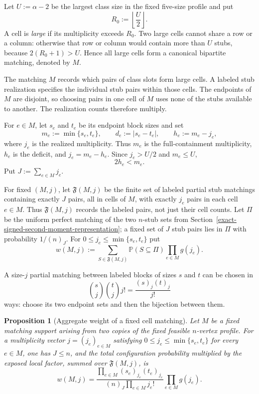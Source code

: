 \documentclass[a4paper,10pt,reqno]{amsart}
\numberwithin{equation}{section}
\theoremstyle{plain}
\newtheorem{proposition}[theorem]{Proposition}
\theoremstyle{remark}
\begin{document}
Let $U:=\alpha-2$ be the largest class size in the fixed five-size profile and put
\[
  R_0:=\left\lfloor\frac U2\right\rfloor.
\]
A cell is \emph{large} if its multiplicity exceeds $R_0$. Two large cells cannot
share a row or a column: otherwise that row or column would contain more than
$U$ stubs, because $2(R_0+1)>U$. Hence all large cells form a canonical
bipartite matching, denoted by $M$.

The matching $M$ records which pairs of class slots form large cells.
A labeled stub realization specifies the individual stub pairs within
those cells. The endpoints of $M$ are disjoint, so choosing pairs in one
cell of $M$ uses none of the stubs available to another. The realization
counts therefore multiply.

For $e\in M$, let $s_e$ and $t_e$ be its endpoint block sizes and set
\[
  m_e:=\min\{s_e,t_e\},
  \qquad
  d_e:=|s_e-t_e|,
  \qquad
  h_e:=m_e-j_e,
\]
where $j_e$ is the realized multiplicity. Thus $m_e$ is the full-containment
multiplicity, $h_e$ is the deficit, and $j_e=m_e-h_e$. Since $j_e>U/2$ and
$m_e\le U$,
\begin{equation}
  2h_e<m_e.
  \label{eq:half-deficit}
\end{equation}
Put $J:=\sum_{e\in M}j_e$.

For fixed $(M,j)$, let $\mathfrak F(M,j)$ be the finite set of labeled partial
stub matchings containing exactly $J$ pairs, all in cells of $M$, with exactly
$j_e$ pairs in each cell $e\in M$.  Thus
\(\mathfrak F(M,j)\) records the labeled pairs, not just their cell counts.
Let $\Pi$ be the uniform perfect matching of the two $n$-stub sets from
Section~\ref{exact-signed-second-moment-representation}; a fixed set of $J$
stub pairs lies in $\Pi$ with probability $1/(n)_J$. For
$0\le j_e\le\min\{s_e,t_e\}$ put
\[
  w(M,j):=\sum_{S\in\mathfrak F(M,j)}\mathbb P(S\subseteq\Pi)
          \prod_{e\in M}g(j_e).
\]

A size-$j$ partial matching between labeled blocks of sizes $s$ and $t$ can be
chosen in
\[
  \binom sj\binom tj j!
  =
  \frac{(s)_j(t)_j}{j!}
\]
ways: choose its two endpoint sets and then the bijection between them.

\begin{proposition}[Aggregate weight of a fixed cell matching]
\label{prop:aggregate-high-weight}
Let $M$ be a fixed matching support arising from two copies of the fixed
feasible $n$-vertex profile. For a multiplicity vector
$j=(j_e)_{e\in M}$ satisfying
$0\le j_e\le\min\{s_e,t_e\}$ for every $e\in M$, one has $J\le n$, and the
total configuration probability multiplied by the exposed local factor, summed
over \(\mathfrak F(M,j)\), is
\begin{equation}
  w(M,j)
  =
  \frac{
    \displaystyle\prod_{e\in M}(s_e)_{j_e}(t_e)_{j_e}
  }{
    \displaystyle(n)_J\prod_{e\in M}j_e!
  }
  \prod_{e\in M}g(j_e).
  \label{eq:aggregate-high-weight}
\end{equation}
\end{proposition}
\end{document}
